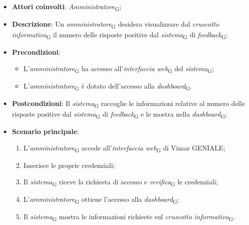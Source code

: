 \begin{itemize}
    \item \textbf{Attori coinvolti}: \textit{Amministratore}\textsubscript{G};
    \item \textbf{Descrizione}: Un \textit{amministratore}\textsubscript{G} desidera visualizzare dal \textit{cruscotto informativo}\textsubscript{G} il numero delle risposte positive dal \textit{sistema}\textsubscript{G} di \textit{feedback}\textsubscript{G};
    \item \textbf{Precondizioni}: 
    \begin{itemize}
        \item L’\textit{amministratore}\textsubscript{G} ha accesso all’\textit{interfaccia web}\textsubscript{G} del \textit{sistema}\textsubscript{G};
        \item L’\textit{amministratore}\textsubscript{G} è dotato dell’accesso alla \textit{dashboard}\textsubscript{G}.
    \end{itemize}
    \item \textbf{Postcondizioni}: Il \textit{sistema}\textsubscript{G} raccoglie le informazioni relative al numero delle risposte positive dal \textit{sistema}\textsubscript{G} di \textit{feedback}\textsubscript{G} e le mostra nella \textit{dashboard}\textsubscript{G};
    \item \textbf{Scenario principale}:
    \begin{enumerate}
        \item L’\textit{amministratore}\textsubscript{G} accede all’\textit{interfaccia web}\textsubscript{G} di Vimar GENIALE;
        \item Inserisce le proprie credenziali;
        \item Il \textit{sistema}\textsubscript{G} riceve la richiesta di accesso e \textit{verifica}\textsubscript{G} le credenziali;
        \item L’\textit{amministratore}\textsubscript{G} ottiene l’accesso alla \textit{dashboard}\textsubscript{G};
        \item Il \textit{sistema}\textsubscript{G} mostra le informazioni richieste sul \textit{cruscotto informativo}\textsubscript{G}.
    \end{enumerate}
\end{itemize}

